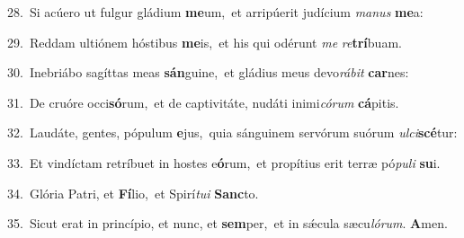 {\numbfont\textcolor{\numbcolor}{28.}}~Si acúero ut fulgur gládium \textbf{me}\-um,~\star et arripúerit judícium \textit{ma}\-\textit{nus} \textbf{me}\-a:\par
{\numbfont\textcolor{\numbcolor}{29.}}~Reddam ultiónem hóstibus \textbf{me}\-is,~\star et his qui odérunt \textit{me} \textit{re}\-\textbf{trí}buam.\par
{\numbfont\textcolor{\numbcolor}{30.}}~Inebriábo sagíttas meas \textbf{sán}\-guine,~\star et gládius meus devo\-\textit{rá}\-\textit{bit} \textbf{car}\-nes:\par
{\numbfont\textcolor{\numbcolor}{31.}}~De cruóre occi\-\textbf{só}\-rum,~\star et de captivitáte, nudáti inimi\-\textit{có}\-\textit{rum} \textbf{cá}\-pitis.\par
{\numbfont\textcolor{\numbcolor}{32.}}~Laudáte, gentes, pópulum \textbf{e}\-jus,~\star quia sánguinem servórum suórum \textit{ul}\-\textit{ci}\textbf{scé}tur:\par
{\numbfont\textcolor{\numbcolor}{33.}}~Et vindíctam retríbuet in hostes e\-\textbf{ó}\-rum,~\star et propítius erit terræ pó\-\textit{pu}\-\textit{li} \textbf{su}\-i.\par
{\numbfont\textcolor{\numbcolor}{34.}}~Glória Patri, et \textbf{Fí}\-lio,~\star et Spirí\-\textit{tu}\-\textit{i} \textbf{Sanc}\-to.\par
{\numbfont\textcolor{\numbcolor}{35.}}~Sicut erat in princípio, et nunc, et \textbf{sem}\-per,~\star et in sǽcula sæcu\-\textit{ló}\-\textit{rum}. \textbf{A}\-men.\par
